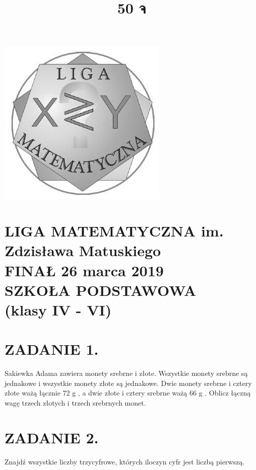 \documentclass[10pt]{article}
\title{50 จ }
\author{}
\date{}
\begin{document}
\maketitle
\begin{center}
\includegraphics[max width=\textwidth]{2024_11_21_0e7bdb5465f22a653800g-1}
\end{center}

\section*{LIGA MATEMATYCZNA im. Zdzisława Matuskiego \\
 FINAŁ 26 marca 2019 \\
 SZKOŁA PODSTAWOWA \\
 (klasy IV - VI)}
\section*{ZADANIE 1.}
Sakiewka Adama zawiera monety srebrne i złote. Wszystkie monety srebrne są jednakowe i wszystkie monety złote są jednakowe. Dwie monety srebrne i cztery złote ważą łącznie 72 g , a dwie złote i cztery srebrne ważą 66 g . Oblicz łączną wagę trzech złotych i trzech srebrnych monet.

\section*{ZADANIE 2.}
Znajdź wszystkie liczby trzycyfrowe, których iloczyn cyfr jest liczbą pierwszą.
\end{document}
